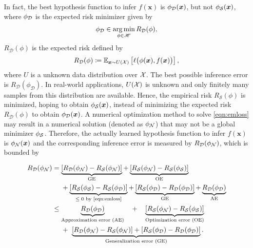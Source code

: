 \documentclass[nohyperref]{article}
\theoremstyle{plain}
\theoremstyle{definition}
\theoremstyle{remark}
\begin{document}
	
In fact, the best hypothesis function to infer $f(\bm{x})$ is $\phi_{\mathcal{D}}(\bm{x})$, but not $\phi_{\mathcal{S}}(\bm{x})$, where $\phi_{\mathcal{D}}$ is the expected risk minimizer given by
\begin{equation*}%
	\phi_\calD
	\in 
	\argmin_{\phi\in \scrH} R_{\calD}(\phi),
	\end{equation*}
 $R_{\mathcal{D}}(\phi)$ is the expected risk defined by  
\begin{equation*}
    R_{\mathcal{D}}(\phi)\coloneqq
	\mathbb{E}_{\bm{x}\sim U({\mathcal{X}})} \left[\ell\big( \phi(\bm{x}),f(\bm{x})\big)\right],
\end{equation*}
where $U$ is a unknown data distribution over ${\mathcal{X}}$.
The best possible inference error is $R_{\mathcal{D}}(\phi_{\mathcal{D}})$. In real-world applications, $U({\mathcal{X}})$ is unknown and only finitely many samples from this distribution are available. Hence, the empirical risk $R_{\mathcal{S}}(\phi)$ is minimized, hoping to obtain $\phi_{\mathcal{S}}(\bm{x})$, instead of minimizing the expected risk $R_{\mathcal{D}}(\phi)$ to obtain $\phi_{\mathcal{D}}(\bm{x})$. A numerical optimization method to solve \eqref{eqn:emloss} may result in a numerical solution (denoted as $\phi_{\mathcal{N}}$) that may not be a global minimizer $\phi_{\mathcal{S}}$. Therefore, the actually learned hypothesis function to infer $f(\bm{x})$ is $\phi_{\mathcal{N}}(\bm{x})$ and the corresponding inference error is measured by $R_{\mathcal{D}}(\phi_{\mathcal{N}})$, which is bounded by
\begin{scriptsize}
\begin{equation*}
\begin{aligned}%
	R_{\calD}(\phi_\calN)
	& =\underbrace{
    	[R_{\calD}(\phi_\calN)-R_{\calS}(\phi_{\calN})]
	}_{\tn{GE}}
	+\underbrace{
    	[R_{\calS}(\phi_{\calN})-R_{\calS}(\phi_{\calS})]
	}_{\tn{OE}}
	\\   &\quad\ 
	+\underbrace{
    	[R_{\calS}(\phi_{\calS})-R_{\calS}(\phi_{\mathcal{D}})]
	}_{\tn{$\le 0$ by \eqref{eqn:emloss}}} +\underbrace{
    	[R_{\calS}(\phi_{\mathcal{D}})-R_{\mathcal{D}}(\phi_{\mathcal{D}})]
	}_{\tn{GE}}
	+\underbrace{
    	R_{\mathcal{D}}(\phi_{\mathcal{D}})
	}_{\tn{AE}}
	 \\ &
	 \le \underbrace{R_{\mathcal{D}}(\phi_{\mathcal{D}})}_{\tn{Approximation error (AE)}} 
	 \quad +\quad  
	 \underbrace{
    	 [R_{\calS}(\phi_{\calN})-R_{\calS}(\phi_{\calS})]
	 }_{\tn{Optimization error (OE)}}
		\\   &\quad\    + \  
		\underbrace{
    		[R_{\mathcal{D}}(\phi_{\calN})-R_{\calS}(\phi_{\calN})]
    		+[R_{\calS}(\phi_{\mathcal{D}})-R_{\mathcal{D}}(\phi_{\mathcal{D}})]
		}_{\tn{Generalization error (GE)}}.
\end{aligned}
\end{equation*}
\end{scriptsize}
\end{document}
